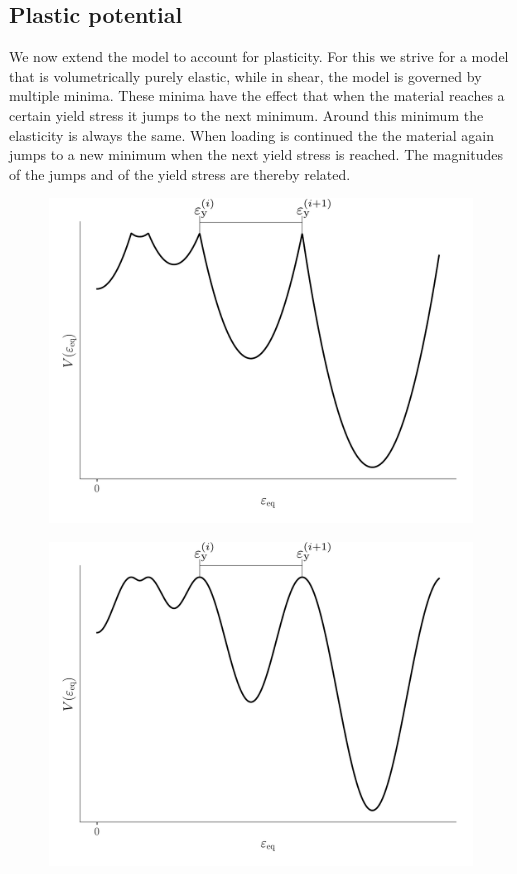 \documentclass[times,namecite]{goose-article}
\begin{document}
\subsection{Plastic potential}

We now extend the model to account for plasticity. For this we strive for a model that is volumetrically purely elastic, while in shear, the model is governed by multiple minima. These minima have the effect that when the material reaches a certain yield stress it jumps to the next minimum. Around this minimum the elasticity is always the same. When loading is continued the the material again jumps to a new minimum when the next yield stress is reached. The magnitudes of the jumps and of the yield stress are thereby related.

\begin{figure}[htp]
  \centering
  \captionsetup[subfigure]{justification=centering}
  \begin{minipage}[t]{.49\textwidth}
    \centering
    \includegraphics[width=1.\textwidth]{potential_V-plas}
    \label{fig:V-plas}
  \end{minipage}
  \hfill
  \begin{minipage}[t]{.49\textwidth}
    \centering
    \includegraphics[width=1.\textwidth]{potential_V-plas-smooth}

\end{minipage}
\end{figure}
\end{document}
